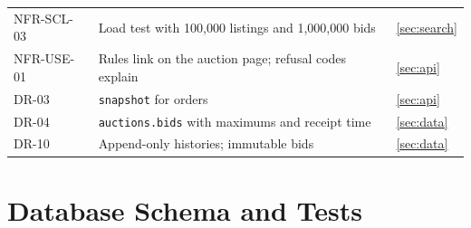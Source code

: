 \documentclass[11pt,a4paper]{article}
\begin{document}
{\begin{longtable}{@{}>{\ttfamily}p{2.4cm}>{\raggedright\arraybackslash}p{10.6cm}>{\raggedright\arraybackslash}p{2.2cm}@{}}
NFR-SCL-03 & Load test with 100{,}000 listings and 1{,}000{,}000 bids & \ref{sec:search} \\
NFR-USE-01 & Rules link on the auction page; refusal codes explain & \ref{sec:api} \\
DR-03 & \texttt{snapshot} for orders & \ref{sec:api} \\
DR-04 & \texttt{auctions.bids} with maximums and receipt time & \ref{sec:data} \\
DR-10 & Append-only histories; immutable bids & \ref{sec:data} \\
\bottomrule\end{longtable}}


\section{Database Schema and Tests}
\label{app:ddl}
\end{document}
